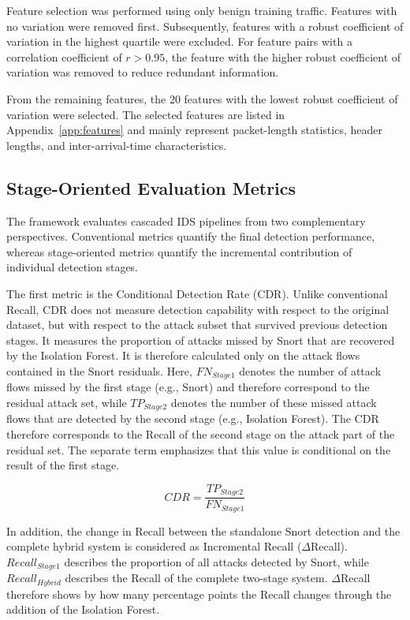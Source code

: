 \documentclass[conference]{IEEEtran}
\begin{document}
Feature selection was performed using only benign training traffic. Features
with no variation were removed first. Subsequently, features with a robust
coefficient of variation in the highest quartile were excluded. For feature
pairs with a correlation coefficient of $r>0.95$, the feature with the higher
robust coefficient of variation was removed to reduce redundant information.

From the remaining features, the 20 features with the lowest robust
coefficient of variation were selected. The selected features are listed in
Appendix~\ref{app:features} and mainly represent packet-length statistics,
header lengths, and inter-arrival-time characteristics.



\subsection{Stage-Oriented Evaluation Metrics}
\label{subsec:evaluation-metrics}
The framework evaluates cascaded IDS pipelines from two complementary
perspectives. Conventional metrics quantify the final detection performance,
whereas stage-oriented metrics quantify the incremental contribution of
individual detection stages. 


The first metric is the Conditional Detection Rate (CDR). Unlike conventional Recall, CDR does not measure detection capability with respect to the original dataset, but with respect to the attack subset that survived previous detection stages. It measures the proportion of attacks missed by Snort that are recovered by the Isolation Forest. It is therefore calculated only on the attack flows contained in the Snort residuals. Here, $FN_{Stage1}$ denotes the number of attack flows missed by the first stage (e.g., Snort) and therefore correspond to the residual attack set, while $TP_{Stage2}$ denotes the number of these missed attack flows that are detected by the second stage (e.g., Isolation Forest). The CDR therefore corresponds to the Recall of the second stage on the attack part of the residual set. The separate term emphasizes that this value is conditional on the result of the first stage.

\begin{equation}
CDR = \frac{TP_{Stage2}}{FN_{Stage1}}
\label{eq:cdr}
\end{equation}


In addition, the change in Recall between the standalone Snort detection and the complete hybrid system is considered as Incremental Recall ($\Delta$Recall). $Recall_{Stage1}$ describes the proportion of all attacks detected by Snort, while $Recall_{Hybrid}$ describes the Recall of the complete two-stage system. $\Delta$Recall therefore shows by how many percentage points the Recall changes through the addition of the Isolation Forest.
\end{document}
